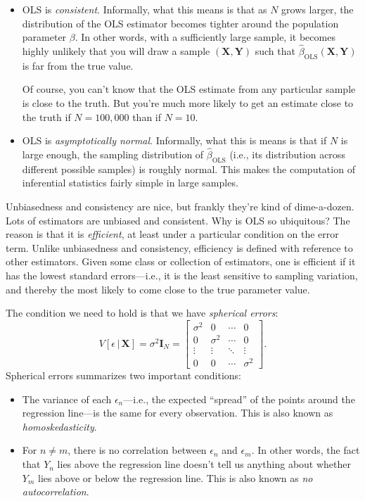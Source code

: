 \documentclass[
  12pt,
  oneside,openany]{book}
\begin{document}
\begin{itemize}
\item
  OLS is \emph{consistent}. Informally, what this means is that as \(N\) grows larger, the distribution of the OLS estimator becomes tighter around the population parameter \(\beta\). In other words, with a sufficiently large sample, it becomes highly unlikely that you will draw a sample \((\mathbf{X}, \mathbf{Y})\) such that \(\hat{\beta}_{\text{OLS}}(\mathbf{X}, \mathbf{Y})\) is far from the true value.

  Of course, you can't know that the OLS estimate from any particular sample is close to the truth. But you're much more likely to get an estimate close to the truth if \(N = 100{,}000\) than if \(N = 10\).
\item
  OLS is \emph{asymptotically normal}. Informally, what this is means is that if \(N\) is large enough, the sampling distribution of \(\hat{\beta}_{\text{OLS}}\) (i.e., its distribution across different possible samples) is roughly normal. This makes the computation of inferential statistics fairly simple in large samples.
\end{itemize}

Unbiasedness and consistency are nice, but frankly they're kind of dime-a-dozen. Lots of estimators are unbiased and consistent. Why is OLS so ubiquitous? The reason is that it is \emph{efficient}, at least under a particular condition on the error term. Unlike unbiasedness and consistency, efficiency is defined with reference to other estimators. Given some class or collection of estimators, one is efficient if it has the lowest standard errors---i.e., it is the least sensitive to sampling variation, and thereby the most likely to come close to the true parameter value.

The condition we need to hold is that we have \emph{spherical errors}:
\[
V[\epsilon \,|\, \mathbf{X}] = \sigma^2 \mathbf{I}_N
= \begin{bmatrix}
  \sigma^2 & 0 & \cdots & 0 \\
  0 & \sigma^2 & \cdots & 0 \\
  \vdots & \vdots & \ddots & \vdots \\
  0 & 0 & \cdots & \sigma^2
\end{bmatrix}.
\]
Spherical errors summarizes two important conditions:

\begin{itemize}
\item
  The variance of each \(\epsilon_n\)---i.e., the expected ``spread'' of the points around the regression line---is the same for every observation. This is also known as \emph{homoskedasticity}.
\item
  For \(n \neq m\), there is no correlation between \(\epsilon_n\) and \(\epsilon_m\). In other words, the fact that \(Y_n\) lies above the regression line doesn't tell us anything about whether \(Y_m\) lies above or below the regression line. This is also known as \emph{no autocorrelation}.
\end{itemize}
\end{document}
